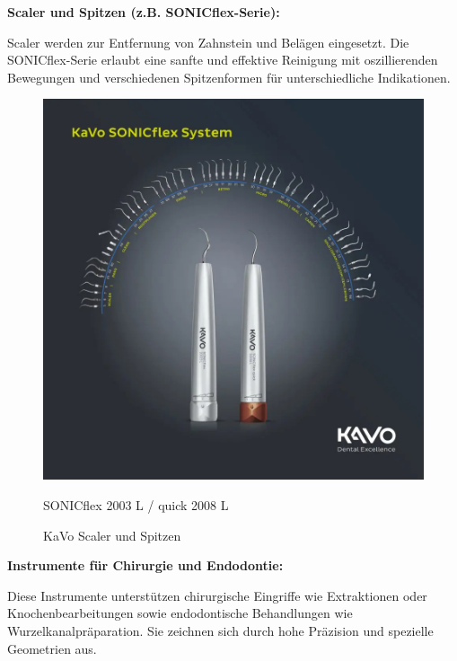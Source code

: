 \textbf{Scaler und Spitzen (z.B. SONICflex-Serie):}

Scaler werden zur Entfernung von Zahnstein und Belägen eingesetzt. Die SONICflex-Serie erlaubt eine sanfte und effektive Reinigung mit oszillierenden Bewegungen und verschiedenen Spitzenformen für unterschiedliche Indikationen.

\begin{figure}[H]
  \centering
  \begin{minipage}[b]{0.45\textwidth}
    \centering
    \includegraphics[width=\textwidth]{images/SONICflex_Spitzenkreis-dunkel_20210112_1000px.jpg}
    \caption*{SONICflex 2003 L / quick 2008 L}
  \end{minipage}
  \hspace{0.05\textwidth}
  \caption{KaVo Scaler und Spitzen}
  \label{fig:Scaler und Spitzen}
\end{figure}
\vspace{1em}

\textbf{Instrumente für Chirurgie und Endodontie:}

Diese Instrumente unterstützen chirurgische Eingriffe wie Extraktionen oder Knochenbearbeitungen sowie endodontische Behandlungen wie Wurzelkanalpräparation. Sie zeichnen sich durch hohe Präzision und spezielle Geometrien aus.

